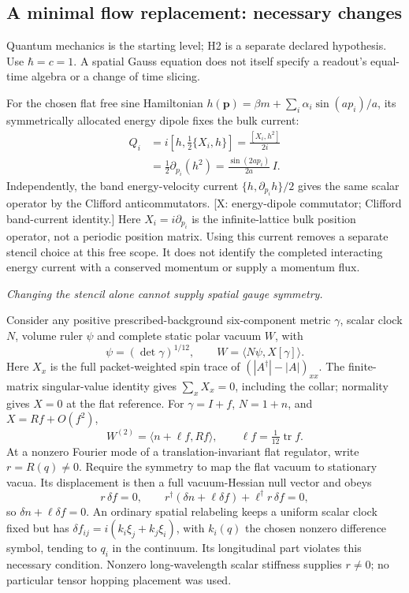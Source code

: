 \subsection*{A minimal flow replacement: necessary changes}
Quantum mechanics is the starting level; H2 is a separate declared
hypothesis.  Use $\hbar=c=1$.
A spatial Gauss equation does not itself specify a
readout's equal-time algebra or a change of time slicing.

For the chosen flat free sine Hamiltonian
$h(\mathbf p)=\beta m+\sum_i\alpha_i\sin(ap_i)/a$, its symmetrically
allocated energy dipole fixes the bulk current:
\[
 \begin{aligned}
 Q_i&=i[h,\tfrac12\{X_i,h\}]
       =\frac{[X_i,h^2]}{2i}\\
    &=\tfrac12\partial_{p_i}(h^2)
       =\frac{\sin(2ap_i)}{2a}\,I .
 \end{aligned}
\]
Independently, the band energy-velocity current
$\{h,\partial_{p_i}h\}/2$ gives the same scalar operator by the
Clifford anticommutators.
[X: energy-dipole commutator; Clifford band-current identity.]
Here $X_i=i\partial_{p_i}$ is the infinite-lattice bulk position
operator, not a periodic position matrix.
Using this current removes a separate stencil choice at this free
scope.  It does not identify the completed interacting energy
current with a conserved momentum or supply a momentum flux.

\emph{Changing the stencil alone cannot supply spatial gauge symmetry.}

Consider any positive prescribed-background six-component metric
$\gamma$, scalar clock $N$, volume ruler $\psi$ and complete static
polar vacuum $W$, with
\[
 \psi=(\det\gamma)^{1/12},\qquad
 W=\langle N\psi,X[\gamma]\rangle .
\]
Here $X_x$ is the full packet-weighted spin trace of
$(|A^\dagger|-|A|)_{xx}$.
The finite-matrix singular-value identity gives $\sum_xX_x=0$,
including the collar; normality gives $X=0$ at the flat reference.
For $\gamma=I+f$, $N=1+n$, and $X=Rf+O(f^2)$,
\[
 W^{(2)}=\langle n+\ell f,Rf\rangle,
 \qquad \ell f=\tfrac1{12}\operatorname{tr}f .
\]
At a nonzero Fourier mode of a translation-invariant flat regulator,
write $r=R(q)\ne0$.  Require the symmetry to map the flat vacuum
to stationary vacua.  Its displacement is then a full
vacuum-Hessian null vector and obeys
\[
 r\,\delta f=0,\qquad
 r^\dagger(\delta n+\ell\delta f)+\ell^\dagger r\,\delta f=0,
\]
so $\delta n+\ell\delta f=0$.
An ordinary spatial relabeling keeps a uniform scalar clock fixed
but has $\delta f_{ij}=i(k_i\xi_j+k_j\xi_i)$, with $k_i(q)$ the
chosen nonzero difference symbol, tending to $q_i$ in the continuum.
Its longitudinal part violates this necessary condition.
Nonzero long-wavelength scalar stiffness supplies $r\ne0$;
no particular tensor hopping placement was used.

